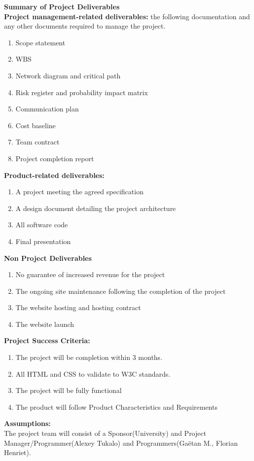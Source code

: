 \documentclass[english]{article}
\begin{document}
  \begin{framed}
  \textbf{Summary of Project Deliverables}\\
  
 \textbf{Project management-related deliverables: }the following documentation and any other documents required to manage the project.
 \begin{enumerate}
  \item  Scope statement
  \item WBS
  \item Network diagram and critical path
  \item Risk register and probability impact matrix
  \item Communication plan
  \item Cost baseline
  \item Team contract
  \item Project completion report
	\end{enumerate}


 \textbf{Product-related deliverables:}
  \begin{enumerate}
  \item A project meeting the agreed specification
  \item A design document detailing the project architecture
  \item All software code
  \item Final presentation
	\end{enumerate}


\textbf{Non Project Deliverables}
  \begin{enumerate}
  \item No guarantee of increased revenue for the project
  \item The ongoing site maintenance following the completion of the project
  \item The website hosting and hosting contract
  \item The website launch
	\end{enumerate}
  \end{framed}
  \begin{framed}
  \textbf{Project Success Criteria:} \\
   \begin{enumerate}
  \item The project will be completion within 3 months.
  \item All HTML and CSS to validate to W3C standards.
  \item The project will be fully functional
  \item The product will follow Product Characteristics and Requirements
	\end{enumerate}
  \end{framed}
  \begin{framed}
\textbf{Assumptions:} \\
 The project team will consist of a Sponsor(University) and Project Manager/Programmer(Alexey Tukalo) and Programmers(Gaëtan M., Florian Henriet).
\end{framed}
\end{document}
